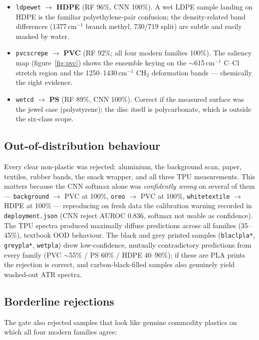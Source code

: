 \documentclass[11pt,a4paper]{article}
\begin{document}
\begin{itemize}
  \item \texttt{ldpewet} $\to$ \textbf{HDPE} (RF 96\%, CNN 100\%). A wet LDPE
        sample landing on HDPE is the familiar polyethylene-pair confusion;
        the density-related band differences (1377\,cm$^{-1}$ branch methyl,
        730/719 split) are subtle and easily masked by water.
  \item \texttt{pvcscrepe} $\to$ \textbf{PVC} (RF 92\%; all four modern
        families 100\%). The saliency map (figure~\ref{fig:pvc}) shows the
        ensemble keying on the $\sim$615\,cm$^{-1}$ C--Cl stretch region and
        the 1250--1430\,cm$^{-1}$ CH$_2$ deformation bands --- chemically the
        right evidence.
  \item \texttt{wetcd} $\to$ \textbf{PS} (RF 89\%, CNN 100\%). Correct if the
        measured surface was the jewel case (polystyrene); the disc itself is
        polycarbonate, which is outside the six-class scope.
\end{itemize}

\subsection{Out-of-distribution behaviour}

Every clear non-plastic was rejected: aluminium, the background scan, paper,
textiles, rubber bands, the snack wrapper, and all three TPU measurements.
This matters because the CNN softmax alone was \emph{confidently wrong} on
several of them --- \texttt{background} $\to$ PVC at 100\%, \texttt{oreo}
$\to$ PVC at 100\%, \texttt{whitetextile} $\to$ HDPE at 100\% --- reproducing
on fresh data the calibration warning recorded in \texttt{deployment.json}
(CNN reject AUROC 0.836, softmax not usable as confidence). The TPU spectra
produced maximally diffuse predictions across all families (35--45\%),
textbook OOD behaviour. The black and grey printed samples
(\texttt{blaclpla*}, \texttt{greypla*}, \texttt{wetpla}) drew low-confidence,
mutually contradictory predictions from every family (PVC $\sim$55\% / PS
60\% / HDPE 40--90\%); if these are PLA prints the rejection is correct, and
carbon-black-filled samples also genuinely yield washed-out ATR spectra.

\subsection{Borderline rejections}

The gate also rejected samples that look like genuine commodity plastics on
which all four modern families agree:
\end{document}
